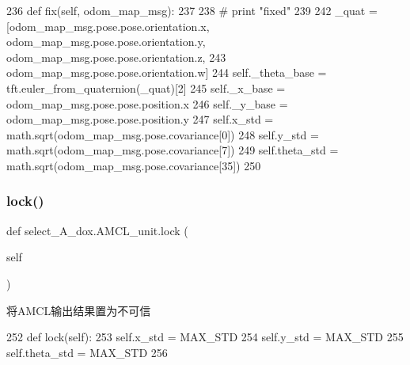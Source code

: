 \begin{DoxyCode}
236     \textcolor{keyword}{def }fix(self, odom\_map\_msg):
237 
238         \textcolor{comment}{# print "fixed"}
239         
242         \_quat = [odom\_map\_msg.pose.pose.orientation.x, odom\_map\_msg.pose.pose.orientation.y, 
      odom\_map\_msg.pose.pose.orientation.z,
243                  odom\_map\_msg.pose.pose.orientation.w]
244         self.\_theta\_base = tft.euler\_from\_quaternion(\_quat)[2]
245         self.\_x\_base = odom\_map\_msg.pose.pose.position.x
246         self.\_y\_base = odom\_map\_msg.pose.pose.position.y
247         self.x\_std = math.sqrt(odom\_map\_msg.pose.covariance[0])
248         self.y\_std = math.sqrt(odom\_map\_msg.pose.covariance[7])
249         self.theta\_std = math.sqrt(odom\_map\_msg.pose.covariance[35])
250 
\end{DoxyCode}
\mbox{\label{classselect___a__dox_1_1_a_m_c_l__unit_a75cca19313b32fbed7fbd1181c06761c}} 
\subsubsection{\texorpdfstring{lock()}{lock()}}
{\footnotesize\ttfamily def select\+\_\+\+A\+\_\+dox.\+A\+M\+C\+L\+\_\+unit.\+lock (\begin{DoxyParamCaption}\item[{}]{self }\end{DoxyParamCaption})}



将\+A\+M\+C\+L输出结果置为不可信 


\begin{DoxyCode}
252     \textcolor{keyword}{def }lock(self):
253         self.x\_std = MAX\_STD
254         self.y\_std = MAX\_STD
255         self.theta\_std = MAX\_STD
256 
\end{DoxyCode}
\mbox{\label{classselect___a__dox_1_1_a_m_c_l__unit_a82003fb543cb2eba9752b571e2b1afdd}} 
